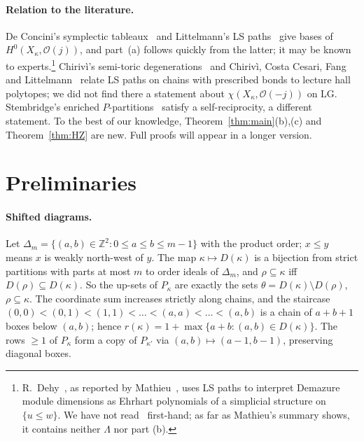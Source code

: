 \documentclass[submission]{FPSAC2027}
\theoremstyle{definition}
\theoremstyle{remark}
\newcommand{\LG}{\mathrm{LG}}
\newcommand{\cO}{\mathcal{O}}
\newcommand{\Z}{\mathbb{Z}}
\begin{document}
\paragraph{Relation to the literature.} De Concini's symplectic tableaux~\cite{DeC79} and
Littelmann's LS paths~\cite{Lit94} give bases of $H^0(X_\kappa,\cO(j))$, and part~(a) follows
quickly from the latter; it may be known to experts.\footnote{R.~Dehy~\cite{Dehy98}, as reported
by Mathieu~\cite[\S4]{Mat95}, uses LS paths to interpret Demazure module dimensions as Ehrhart
polynomials of a simplicial structure on $\{u\le w\}$. We have not read~\cite{Dehy98} first-hand;
as far as Mathieu's summary shows, it contains neither $\Lambda$ nor part (b).} Chirivì's
semi-toric degenerations~\cite{Chi00} and Chirivì, Costa Cesari, Fang and Littelmann~\cite{CCFL}
relate LS paths on chains with prescribed bonds to lecture hall polytopes; we did not find there a
statement about $\chi(X_\kappa,\cO(-j))$ on $\LG$. Stembridge's enriched
$P$-partitions~\cite{Stem97} satisfy a self-reciprocity, a different statement. To the best of our
knowledge, Theorem~\ref{thm:main}(b),(c) and Theorem~\ref{thm:HZ} are new. Full proofs will
appear in a longer version.

\section{Preliminaries}\label{sec:prelim}

\paragraph{Shifted diagrams.} Let $\Delta_m=\{(a,b)\in\Z^2:0\le a\le b\le m-1\}$ with the product
order; $x\le y$ means $x$ is weakly north-west of $y$. The map $\kappa\mapsto D(\kappa)$ is a
bijection from strict partitions with parts at most $m$ to order ideals of $\Delta_m$, and
$\rho\subseteq\kappa$ iff $D(\rho)\subseteq D(\kappa)$. So the up-sets of $P_\kappa$ are exactly
the sets $\theta=D(\kappa)\setminus D(\rho)$, $\rho\subseteq\kappa$. The coordinate sum increases
strictly along chains, and the staircase $(0,0)<(0,1)<(1,1)<\dots<(a,a)<\dots<(a,b)$ is a chain of
$a+b+1$ boxes below $(a,b)$; hence $r(\kappa)=1+\max\{a+b:(a,b)\in D(\kappa)\}$. The rows $\ge1$ of
$P_\kappa$ form a copy of $P_{\kappa'}$ via $(a,b)\mapsto(a-1,b-1)$, preserving diagonal boxes.
\end{document}
